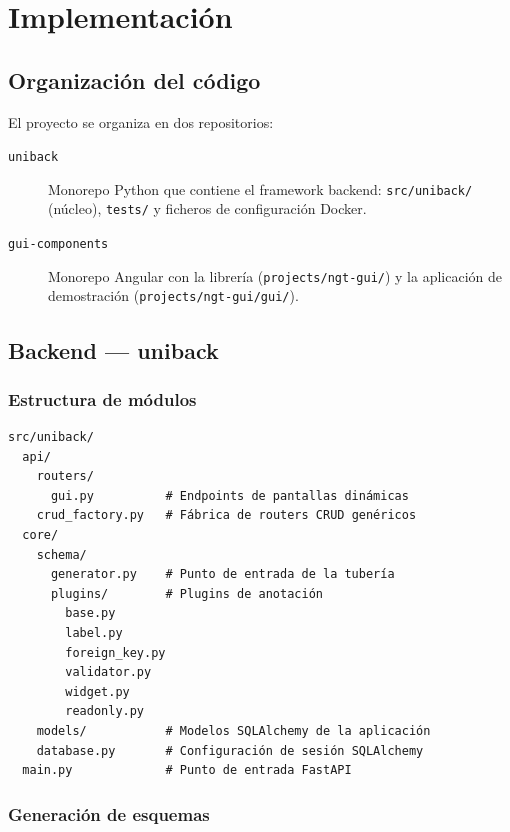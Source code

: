 \chapter{Implementación}
\label{ch:implementacion}

\section{Organización del código}
\label{sec:org-codigo}

El proyecto se organiza en dos repositorios:

\begin{description}
  \item[\texttt{uniback}] Monorepo Python que contiene el framework backend:
    \texttt{src/uniback/} (núcleo), \texttt{tests/} y ficheros de configuración Docker.
  \item[\texttt{gui-components}] Monorepo Angular con la librería (\texttt{projects/ngt-gui/})
    y la aplicación de demostración (\texttt{projects/ngt-gui/gui/}).
\end{description}

\section{Backend — uniback}
\label{sec:impl-backend}

\subsection{Estructura de módulos}
\label{subsec:modulos-backend}

\begin{verbatim}
src/uniback/
  api/
    routers/
      gui.py          # Endpoints de pantallas dinámicas
    crud_factory.py   # Fábrica de routers CRUD genéricos
  core/
    schema/
      generator.py    # Punto de entrada de la tubería
      plugins/        # Plugins de anotación
        base.py
        label.py
        foreign_key.py
        validator.py
        widget.py
        readonly.py
    models/           # Modelos SQLAlchemy de la aplicación
    database.py       # Configuración de sesión SQLAlchemy
  main.py             # Punto de entrada FastAPI
\end{verbatim}

\subsection{Generación de esquemas}
\label{subsec:generacion-esquemas}


